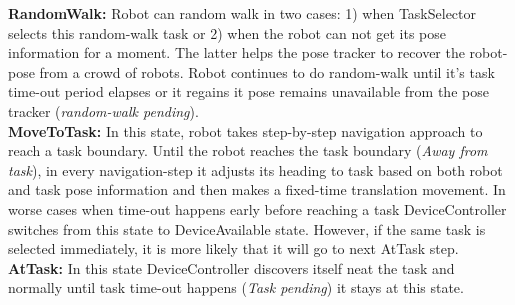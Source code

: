 \textbf{RandomWalk: }
Robot can random walk in two cases: 1) when TaskSelector selects this random-walk task or 2) when the robot can not get its pose information for a moment. The latter helps the pose tracker to recover the robot-pose from a crowd of robots. Robot continues to do random-walk until it's task time-out period elapses or it regains it pose remains unavailable from the pose tracker ({\em random-walk pending}).\\
\textbf{MoveToTask: }
In this state, robot takes step-by-step navigation approach to reach a task boundary. Until the robot reaches the task boundary ({\em Away from task}), in every navigation-step it adjusts its heading to task based on both  robot and task pose information and then makes a fixed-time translation movement. In worse cases when time-out happens early before reaching a task DeviceController switches from this state to DeviceAvailable state. However, if the same task is selected immediately, it is more likely that it will go to next AtTask step.
\textbf{AtTask: }
In this state  DeviceController discovers itself neat the task and normally until task time-out happens ({\em Task pending}) it stays at this state.
